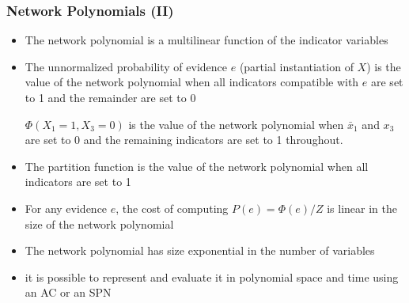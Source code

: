 \documentclass[10pt, t, xcolor={usenames,dvipsnames,svgnames}, compress]{beamer}
\begin{document}
\begin{frame}
\frametitle{Network Polynomials (II)}
\begin{itemize}
\item The  network  polynomial  is  a  multilinear  function  of  the indicator
variables
\item The  unnormalized  probability  of  evidence $e$  (partial  instantiation  of $X$) 
is  the  value  of  the network  polynomial  when  all  indicators  compatible  with
$e$ are set to 1 and the remainder are set to 0

\begin{example}
$\Phi(X_1 = 1, X_3= 0)$ is the value of the network polynomial
when $\bar{x}_1$ and $x_3$ are set to 0 and the remaining indicators
are set to 1 throughout.
\end{example}

\item The partition function is the value of the network polynomial when all
indicators are set to 1

\item For any evidence $e$, the cost of computing $P(e) = \Phi(e)/Z$
is linear in the size of the network polynomial

\item The network polynomial has size exponential in the number
of variables

\item {\color{red}it is possible to represent and evaluate it
in polynomial space and time using an AC or an SPN}
\end{itemize}
\end{frame}
\end{document}
